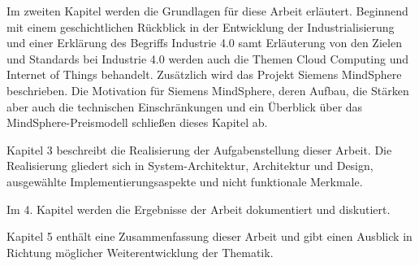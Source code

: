 Im zweiten Kapitel werden die Grundlagen für diese Arbeit erläutert. Beginnend mit einem geschichtlichen Rückblick in der Entwicklung der Industrialisierung und einer Erklärung des Begriffs Industrie 4.0 samt Erläuterung von den Zielen und Standards bei Industrie 4.0 werden auch die Themen Cloud Computing und Internet of Things behandelt. Zusätzlich wird das Projekt Siemens MindSphere beschrieben. Die Motivation für Siemens MindSphere, deren Aufbau, die Stärken aber auch die technischen Einschränkungen und ein Überblick über das MindSphere-Preismodell schließen dieses Kapitel ab.

Kapitel 3 beschreibt die Realisierung der Aufgabenstellung dieser Arbeit. Die Realisierung gliedert sich in System-Architektur, Architektur und Design, ausgewählte Implementierungsaspekte und nicht funktionale Merkmale.

Im 4. Kapitel werden die Ergebnisse der Arbeit dokumentiert und diskutiert. 

Kapitel 5 enthält eine Zusammenfassung dieser Arbeit und gibt einen Ausblick in Richtung möglicher Weiterentwicklung der Thematik.


